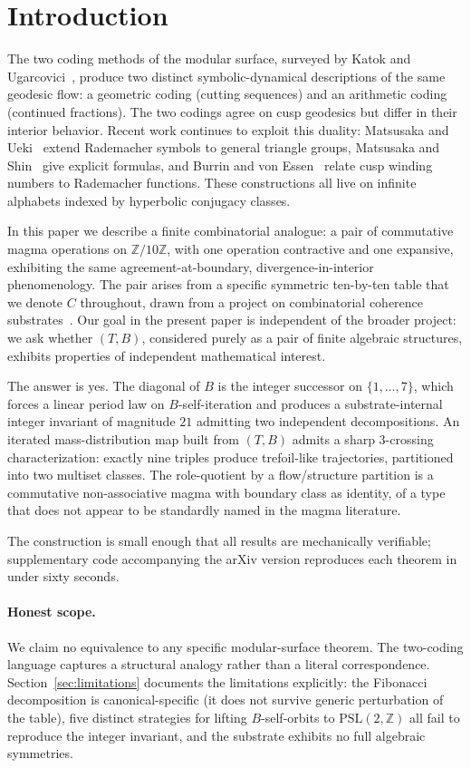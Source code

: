 \documentclass[submission,copyright,creativecommons]{eptcs}
\theoremstyle{plain}
\theoremstyle{definition}
\theoremstyle{remark}
\begin{document}
\section{Introduction}

The two coding methods of the modular surface, surveyed by Katok and
Ugarcovici~\cite{KU07}, produce two distinct symbolic-dynamical descriptions
of the same geodesic flow: a geometric coding (cutting sequences) and an
arithmetic coding (continued fractions). The two codings agree on cusp
geodesics but differ in their interior behavior. Recent work continues to
exploit this duality: Matsusaka and Ueki~\cite{MU23} extend Rademacher
symbols to general triangle groups, Matsusaka and Shin~\cite{MS24} give
explicit formulas, and Burrin and von Essen~\cite{BvE24} relate cusp
winding numbers to Rademacher functions. These constructions all live on
infinite alphabets indexed by hyperbolic conjugacy classes.

In this paper we describe a finite combinatorial analogue: a pair of
commutative magma operations on $\mathbb{Z}/10\mathbb{Z}$, with one
operation contractive and one expansive, exhibiting the same
agreement-at-boundary, divergence-in-interior phenomenology. The pair
arises from a specific symmetric ten-by-ten table that we denote $C$
throughout, drawn from a project on combinatorial coherence
substrates~\cite{TIG2026}. Our goal in the present paper is independent
of the broader project: we ask whether $(T, B)$, considered purely as a
pair of finite algebraic structures, exhibits properties of independent
mathematical interest.

The answer is yes. The diagonal of $B$ is the integer successor on
$\{1, \dots, 7\}$, which forces a linear period law on $B$-self-iteration
and produces a substrate-internal integer invariant of magnitude $21$
admitting two independent decompositions. An iterated mass-distribution
map built from $(T, B)$ admits a sharp $3$-crossing characterization:
exactly nine triples produce trefoil-like trajectories, partitioned into
two multiset classes. The role-quotient by a flow/structure partition is
a commutative non-associative magma with boundary class as identity, of a
type that does not appear to be standardly named in the magma literature.

The construction is small enough that all results are mechanically
verifiable; supplementary code accompanying the arXiv version reproduces
each theorem in under sixty seconds.

\paragraph{Honest scope.} We claim no equivalence to any specific
modular-surface theorem. The two-coding language captures a structural
analogy rather than a literal correspondence. Section~\ref{sec:limitations}
documents the limitations explicitly: the Fibonacci decomposition is
canonical-specific (it does not survive generic perturbation of the table),
five distinct strategies for lifting $B$-self-orbits to
$\mathrm{PSL}(2, \mathbb{Z})$ all fail to reproduce the integer invariant,
and the substrate exhibits no full algebraic symmetries.
\end{document}
